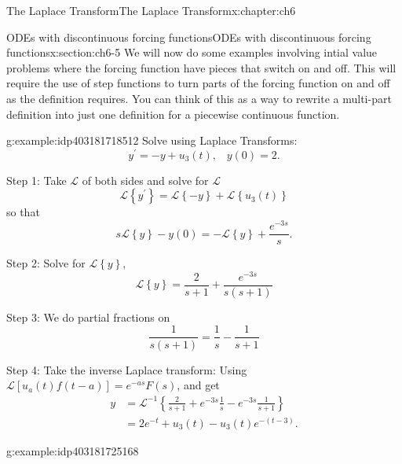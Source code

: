 \documentclass[oneside,10pt,]{book}
\numberwithin{equation}{section}
\numberwithin{equation}{section}
\newcommand{\amp}{&}
\begin{document}
\begin{chapterptx}{The Laplace Transform}{}{The Laplace Transform}{}{}{x:chapter:ch6}
\typeout{************************************************}
%
\begin{sectionptx}{ODEs with discontinuous forcing functions}{}{ODEs with discontinuous forcing functions}{}{}{x:section:ch6-5}
We will now do some examples involving intial value problems where the forcing function have pieces that switch on and off. This will require the use of step functions to turn parts of the forcing function on and off as the definition requires. You can think of this as a way to rewrite a multi-part definition into just one definition for a piecewise continuous function.%
\begin{example}{}{g:example:idp403181718512}%
Solve using Laplace Transforms:%
\begin{equation*}
y^{\prime}=-y+u_{3}(t),\,\,\,\,\,y(0)=2.
\end{equation*}
%
\par
Step 1: Take \(\mathcal{L}\) of both sides and solve for \(\mathcal{L}\)%
\begin{equation*}
\mathcal{L}\left\{ y^{\prime}\right\} =\mathcal{L}\left\{ -y\right\} +\mathcal{L}\left\{ u_{3}(t)\right\} 
\end{equation*}
so that%
\begin{equation*}
s\mathcal{L}\left\{ y\right\} -y(0)=-\mathcal{L}\left\{ y\right\} +\frac{e^{-3s}}{s}.
\end{equation*}
%
\par
Step 2: Solve for \(\mathcal{L}\left\{ y\right\} \),%
\begin{equation*}
\mathcal{L}\left\{ y\right\} =\frac{2}{s+1}+\frac{e^{-3s}}{s\left(s+1\right)}
\end{equation*}
%
\par
Step 3: We do partial fractions on%
\begin{equation*}
\frac{1}{s\left(s+1\right)}=\frac{1}{s}-\frac{1}{s+1}
\end{equation*}
%
\par
Step 4: Take the inverse Laplace transform: Using \(\mathcal{L}\left[u_{a}(t)f(t-a)\right]=e^{-as}F(s)\), and get%
\begin{align*}
y \amp =\mathcal{L}^{-1}\left\{ \frac{2}{s+1}+e^{-3s}\frac{1}{s}-e^{-3s}\frac{1}{s+1}\right\} \\
\amp =2e^{-t}+u_{3}(t)-u_{3}(t)e^{-\left(t-3\right)}.
\end{align*}
%
\end{example}
\begin{example}{}{g:example:idp403181725168}%

\end{example}
\end{sectionptx}
\end{chapterptx}
\end{document}
